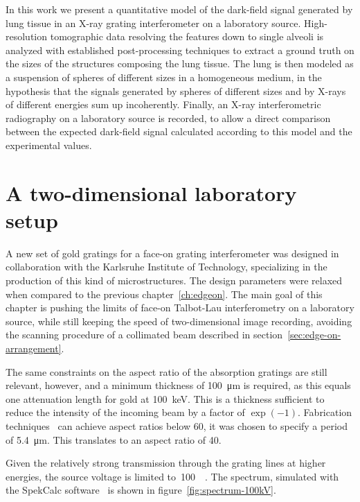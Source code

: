In this work we present a quantitative model of the dark-field signal
generated by lung tissue in an X-ray grating interferometer on a laboratory
source. High-resolution tomographic data resolving the features down to single
alveoli is analyzed with established post-processing techniques to extract a
ground truth on the sizes of the structures composing the lung tissue. The
lung is then modeled as a suspension of spheres of different sizes in a
homogeneous medium, in the hypothesis that the signals generated by spheres
of different sizes and by X-rays of different energies sum up incoherently.
Finally, an X-ray interferometric radiography on a laboratory source is
recorded, to allow a direct comparison between the expected dark-field
signal calculated according to this model and the experimental values.

\section{A two-dimensional laboratory setup}
A new set of gold gratings for a face-on grating interferometer was designed
in collaboration with the Karlsruhe Institute of Technology, specializing in
the production of this kind of microstructures. The design parameters were
relaxed when compared to the previous chapter~\ref{ch:edgeon}. The main goal
of this chapter is pushing the limits of face-on Talbot-Lau
interferometry on a laboratory source, while still keeping the speed of
two-dimensional image recording, avoiding the scanning procedure of a
collimated beam described in section~\ref{sec:edge-on-arrangement}.

The same constraints on the aspect ratio of the absorption gratings are
still relevant, however, and a minimum thickness of \SI{100}{\micro\meter}
is required, as this equals one attenuation length for gold at \SI{100}{\kilo\eV}.
This is a thickness sufficient to reduce the intensity of the incoming beam
by a factor of $\exp(-1)$. Fabrication
techniques~\cite{David2007,Kenntner2010} can achieve aspect ratios below
\num{60}, it was chosen to specify a period of \SI{5.4}{\micro\meter}. This
translates to an aspect ratio of \num{40}.

Given the relatively strong transmission through the grating lines at higher
energies, the source voltage is limited to~\SI{100}{\kilo\voltpeak}. The
spectrum, simulated with the SpekCalc software~\cite{spekcalc} is shown in
figure~\ref{fig:spectrum-100kV}.

